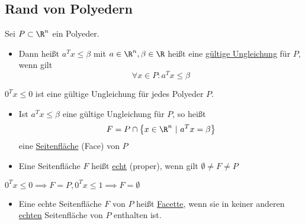 \subsection{Rand von Polyedern}
\begin{definition}
	Sei $P \subset \R^n$ ein Polyeder.
	\begin{itemize}
		\item Dann heißt $a^{T} x \leq \beta$ mit $a \in \R^n, \beta \in \R$ heißt eine \underline{gültige Ungleichung} für $P$, wenn gilt
			 \begin{equation*}
				\forall x \in P: a^{T} x \leq \beta
			\end{equation*}
	\end{itemize}
\end{definition}
\begin{beispiel}
  $0^{T} x \leq 0$ ist eine gültige Ungleichung für jedes Polyeder $P$.
\end{beispiel}
\begin{itemize}
  \item Ist $a^{T} x \leq \beta$ eine gültige Ungleichung für $P$, so heißt
    \begin{equation*}
      F = P \cap \left\{ x \in \R^n\ |\ a^{T} x = \beta \right\}
    \end{equation*}
    eine \underline{Seitenfläche} (Face) von $P$
  \item Eine Seitenfläche $F$ heißt \underline{echt} (proper), wenn gilt $\emptyset \neq F \neq P$
\end{itemize}
\begin{beispiel}
  $0^{T} x \leq 0 \implies F = P, 0^{T} x \leq 1 \implies F = \emptyset$
\end{beispiel}
\begin{itemize}
  \item Eine echte Seitenfläche $F$ von $P$ heißt \underline{Facette}, wenn sie in keiner anderen \underline{echten} Seitenfläche von  $P$ enthalten ist.
\end{itemize} %
